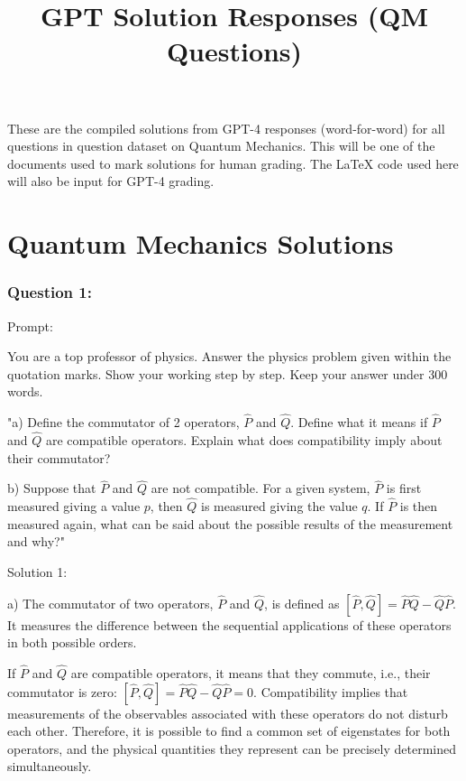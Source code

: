 \documentclass[a4paper,11pt]{article}
\begin{document}
\title{GPT Solution Responses (QM Questions)}
\author{}
\date{}
\maketitle

\noindent These are the compiled solutions from GPT-4 responses (word-for-word) for all questions in question dataset on Quantum Mechanics. This will be one of the documents used to mark solutions for human grading. The LaTeX code used here will also be input for GPT-4 grading. 

\section{Quantum Mechanics Solutions}

\subsubsection*{Question 1:}

Prompt:
\begin{spverbatim}
    You are a top professor of physics. Answer the physics problem given within the quotation marks. Show your working step by step. Keep your answer under 300 words.

    "a) Define the commutator of 2 operators, \( \hat{P} \) and \( \hat{Q} \). Define what it means if \( \hat{P} \) and \( \hat{Q} \) are compatible operators. Explain what does compatibility imply about their commutator?

    b) Suppose that \( \hat{P} \) and \( \hat{Q} \) are not compatible. For a given system, \( \hat{P} \) is first measured giving a value \( p \), then \( \hat{Q} \) is measured giving the value \( q \). If \( \hat{P} \) is then measured again, what can be said about the possible results of the measurement and why?"
\end{spverbatim}

\bigskip

\noindent Solution 1: 

a) The commutator of two operators, \( \hat{P} \) and \( \hat{Q} \), is defined as \([ \hat{P}, \hat{Q} ] = \hat{P}\hat{Q} - \hat{Q}\hat{P}\). It measures the difference between the sequential applications of these operators in both possible orders.

If \( \hat{P} \) and \( \hat{Q} \) are compatible operators, it means that they commute, i.e., their commutator is zero: \([ \hat{P}, \hat{Q} ] = \hat{P}\hat{Q} - \hat{Q}\hat{P} = 0\). Compatibility implies that measurements of the observables associated with these operators do not disturb each other. Therefore, it is possible to find a common set of eigenstates for both operators, and the physical quantities they represent can be precisely determined simultaneously.
\end{document}
